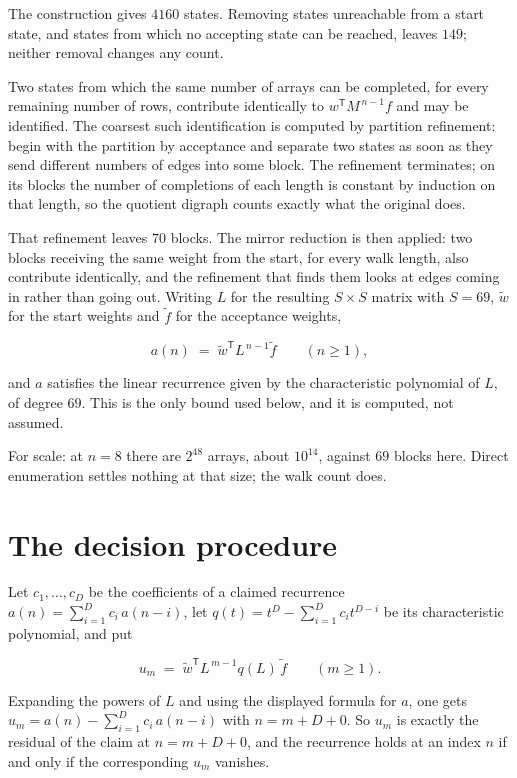 \documentclass[11pt]{article}
\theoremstyle{definition}
\begin{document}
The construction gives $4160$ states. Removing states unreachable from a start state, and states from which no accepting state can be reached, leaves $149$; neither removal changes any count.

Two states from which the same number of arrays can be completed, for every remaining number of rows, contribute identically to $w^{\mathsf T}M^{\,n-1}f$ and may be identified. The coarsest such identification is computed by partition refinement: begin with the partition by acceptance and separate two states as soon as they send different numbers of edges into some block. The refinement terminates; on its blocks the number of completions of each length is constant by induction on that length, so the quotient digraph counts exactly what the original does.

That refinement leaves $70$ blocks. The mirror reduction is then applied: two blocks receiving the same weight from the start, for every walk length, also contribute identically, and the refinement that finds them looks at edges coming in rather than going out. Writing $L$ for the resulting $S \times S$ matrix with $S = 69$, $\tilde w$ for the start weights and $\tilde f$ for the acceptance weights,

\[a(n) \;=\; \tilde w^{\mathsf T} L^{\,n-1} \tilde f \qquad (n \ge 1),\]

and $a$ satisfies the linear recurrence given by the characteristic polynomial of $L$, of degree $69$. This is the only bound used below, and it is computed, not assumed.

For scale: at $n = 8$ there are $2^{48}$ arrays, about $10^{14}$, against $69$ blocks here. Direct enumeration settles nothing at that size; the walk count does.

\section{The decision procedure}

Let $c_1,\dots,c_D$ be the coefficients of a claimed recurrence $a(n) = \sum_{i=1}^{D} c_i\,a(n-i)$, let $q(t) = t^{D} - \sum_{i=1}^{D} c_i t^{D-i}$ be its characteristic polynomial, and put

\[u_m \;=\; \tilde w^{\mathsf T} L^{\,m-1} q(L)\,\tilde f \qquad (m \ge 1).\]

Expanding the powers of $L$ and using the displayed formula for $a$, one gets $u_m = a(n) - \sum_{i=1}^{D} c_i\,a(n-i)$ with $n = m + D + 0$. So $u_m$ is exactly the residual of the claim at $n = m + D + 0$, and the recurrence holds at an index $n$ if and only if the corresponding $u_m$ vanishes.
\end{document}
